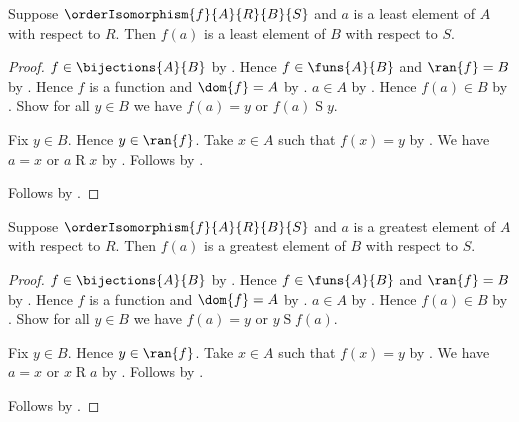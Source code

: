 \begin{proposition}\label{order_isomorphism_preserves_least}
    Suppose $\orderIsomorphism{f}{A}{R}{B}{S}$ and
        $a$ is a least element of $A$ with respect to $R$.
    Then $f(a)$ is a least element of $B$ with respect to $S$.
\end{proposition}
\begin{proof}
    $f\in\bijections{A}{B}$ by .
    Hence $f\in\funs{A}{B}$ and $\ran{f}=B$ by
        .
    Hence $f$ is a function and $\dom{f}=A$ by
        .
    $a\in A$ by .
    Hence $f(a)\in B$ by .
    Show for all $y\in B$ we have $f(a)=y$ or $f(a)\mathrel{S}y$.
    \begin{subproof}
        Fix $y\in B$.
        Hence $y\in\ran{f}$.
        Take $x\in A$ such that $f(x)=y$ by .
        We have $a=x$ or $a\mathrel{R}x$ by .
        Follows by .
    \end{subproof}
    Follows by .
\end{proof}

\begin{proposition}\label{order_isomorphism_preserves_greatest}
    Suppose $\orderIsomorphism{f}{A}{R}{B}{S}$ and
        $a$ is a greatest element of $A$ with respect to $R$.
    Then $f(a)$ is a greatest element of $B$ with respect to $S$.
\end{proposition}
\begin{proof}
    $f\in\bijections{A}{B}$ by .
    Hence $f\in\funs{A}{B}$ and $\ran{f}=B$ by
        .
    Hence $f$ is a function and $\dom{f}=A$ by
        .
    $a\in A$ by .
    Hence $f(a)\in B$ by .
    Show for all $y\in B$ we have $f(a)=y$ or $y\mathrel{S}f(a)$.
    \begin{subproof}
        Fix $y\in B$.
        Hence $y\in\ran{f}$.
        Take $x\in A$ such that $f(x)=y$ by .
        We have $a=x$ or $x\mathrel{R}a$ by .
        Follows by .
    \end{subproof}
    Follows by .
\end{proof}
